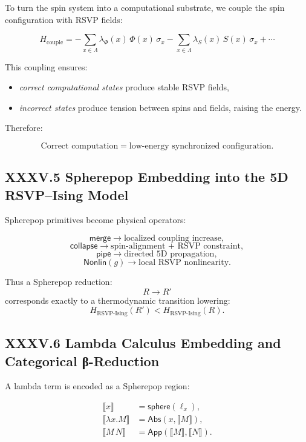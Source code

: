 \documentclass[12pt,letterpaper]{article}
\begin{document}
To turn the spin system into a computational substrate, we couple 
the spin configuration with RSVP fields:

\[
H_{\text{couple}}
=
- \sum_{x \in \Lambda}
\lambda_\Phi(x)\, \Phi(x)\, \sigma_x
- \sum_{x \in \Lambda} \lambda_S(x)\, S(x)\, \sigma_x
+ \cdots
\]

This coupling ensures:

\begin{itemize}
    \item \emph{correct computational states} produce stable RSVP fields,
    \item \emph{incorrect states} produce tension between spins and fields,
          raising the energy.
\end{itemize}

Therefore:

\[
\boxed{
\text{Correct computation} 
= \text{low-energy synchronized configuration}.
}
\]

\subsection{XXXV.5 Spherepop Embedding into the 5D RSVP--Ising Model}

Spherepop primitives become physical operators:

\[
\mathsf{merge} \longrightarrow \text{localized coupling increase},
\]
\[
\mathsf{collapse} \longrightarrow \text{spin-alignment + RSVP constraint},
\]
\[
\mathsf{pipe} \longrightarrow \text{directed 5D propagation},
\]
\[
\mathsf{Nonlin}(g) \longrightarrow \text{local RSVP nonlinearity}.
\]

Thus a Spherepop reduction:
\[
R \to R'
\]
corresponds exactly to a thermodynamic transition lowering:
\[
H_{\text{RSVP-Ising}}(R') < H_{\text{RSVP-Ising}}(R).
\]

\subsection{XXXV.6 Lambda Calculus Embedding and Categorical β-Reduction}

A lambda term is encoded as a Spherepop region:

\[
\begin{aligned}
\llbracket x \rrbracket &= \mathsf{sphere}(\ell_x),\\
\llbracket \lambda x.M \rrbracket &= \mathsf{Abs}(x, \llbracket M \rrbracket),\\
\llbracket M\,N \rrbracket &= \mathsf{App}(\llbracket M \rrbracket, \llbracket N \rrbracket).
\end{aligned}
\]
\end{document}
